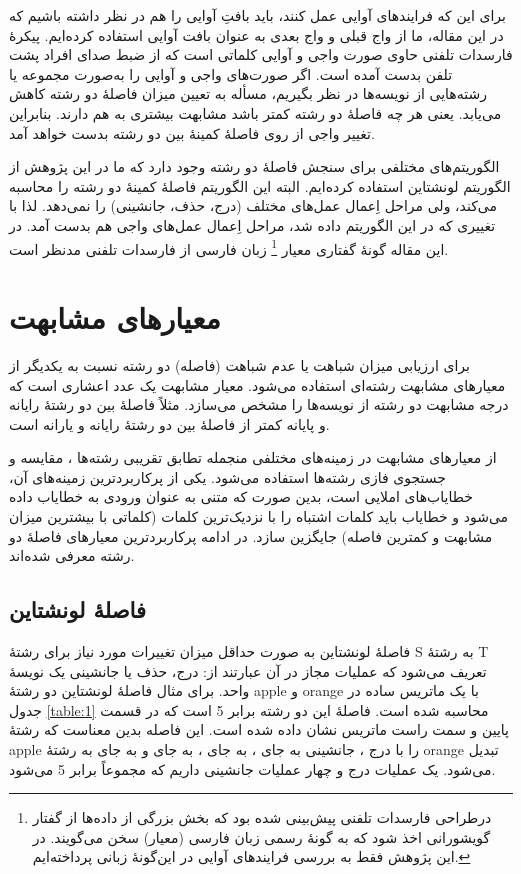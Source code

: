 \documentclass[12pt,onecolumn,a4paper]{article}
\begin{document}
    برای این که فرایندهای آوایی عمل کنند، باید بافتِ آوایی را هم در نظر داشته باشیم که در این مقاله، ما از واج قبلی و واج بعدی به عنوان بافت آوایی استفاده کرده‌ایم. پیکرهٔ فارسدات تلفنی حاوی صورت واجی و آوایی کلماتی است که از ضبط صدای افراد پشت تلفن بدست آمده است. اگر صورت‌های واجی و آوایی را به‌صورت مجموعه یا رشته‌هایی از نویسه‌ها در نظر بگیریم، مسأله به تعیین میزان فاصلۀ دو رشته کاهش می‌یابد. یعنی هر چه فاصلۀ دو رشته کمتر باشد مشابهت بیشتری به هم دارند. بنابراین تغییر واجی از روی فاصلۀ کمینۀ بین دو رشته بدست خواهد آمد.
    \par
    الگوریتم‌های مختلفی برای سنجش فاصلۀ دو رشته وجود دارد که ما در این پژوهش از الگوریتم لونشتاین  استفاده کرده‌ایم. البته این الگوریتم فاصلۀ کمینۀ دو رشته را محاسبه می‌کند، ولی مراحل اِعمال عمل‌های مختلف (درج، حذف، جانشینی) را نمی‌دهد. لذا با تغییری که در این الگوریتم داده شد، مراحل اِعمال عمل‌های واجی هم بدست آمد.
    در این مقاله گونهٔ گفتاری معیار
    \footnote{درطراحی فارسدات تلفنی پیش‌بینی شده بود که بخش بزرگی از داده‌ها از گفتار گویشورانی اخذ شود که به گونهٔ رسمی زبان فارسی (معیار) سخن می‌گویند. در این پژوهش فقط به بررسی فرایندهای آوایی در این‌گونهٔ زبانی پرداخته‌ایم.}
    زبان فارسی از فارسدات تلفنی مدنظر است.

    \section{معیارهای مشابهت}
    برای ارزیابی میزان شباهت یا عدم شباهت (فاصله) دو رشته نسبت به یکدیگر از معیارهای مشابهت رشته‌ای استفاده می‌شود. معیار مشابهت یک عدد اعشاری است که درجه مشابهت دو رشته از نویسه‌ها را مشخص می‌سازد. مثلاً فاصلۀ بین دو رشتۀ رایانه و پایانه کمتر از فاصلۀ بین دو رشتۀ رایانه و یارانه است.
    \par
    از معیارهای مشابهت در زمینه‌های مختلفی منجمله تطابق تقریبی رشته‌ها ، مقایسه  و جستجوی فازی رشته‌ها  استفاده می‌شود. یکی از پرکاربردترین زمینه‌های آن، خطایاب‌های املایی  است، بدین صورت که متنی به عنوان ورودی به خطایاب داده می‌شود و خطایاب باید کلمات اشتباه را با نزدیک‌ترین کلمات (کلماتی با بیشترین میزان مشابهت و کمترین فاصله) جایگزین سازد. در ادامه پرکاربردترین معیارهای فاصلۀ دو رشته معرفی شده‌اند.

    \subsection{فاصلۀ لونشتاین\protect{}}
    فاصلۀ لونشتاین  به صورت حداقل میزان تغییرات مورد نیاز برای رشتۀ S به رشتۀ T تعریف می‌شود که عملیات مجاز در آن عبارتند از: درج، حذف یا جانشینی یک نویسۀ واحد. برای مثال فاصلۀ لونشتاین دو رشتۀ apple و orange با یک ماتریس ساده در جدول \ref{table:1} محاسبه شده است. فاصلۀ این دو رشته برابر 5 است که در قسمت پایین و سمت راست ماتریس نشان داده شده است. این فاصله بدین معناست که رشتۀ apple را با درج ، جانشینی  به جای ،  به جای ،  به جای  و  به جای  به رشتۀ orange تبدیل می‌شود. یک عملیات درج و چهار عملیات جانشینی داریم که مجموعاً برابر 5 می‌شود.
\end{document}
